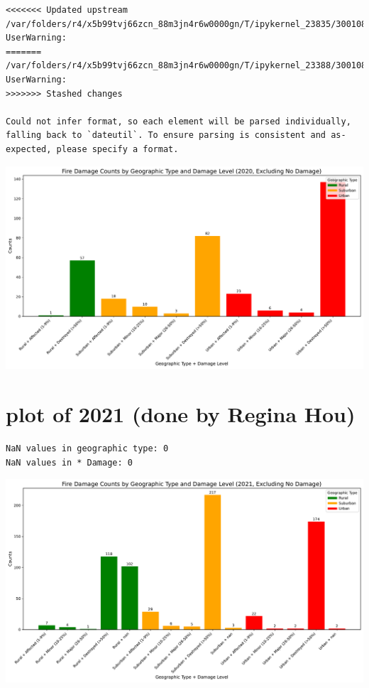 \documentclass[
  letterpaper,
  DIV=11,
  numbers=noendperiod]{scrartcl}
\begin{document}
\begin{verbatim}
<<<<<<< Updated upstream
/var/folders/r4/x5b99tvj66zcn_88m3jn4r6w0000gn/T/ipykernel_23835/3001088990.py:3: UserWarning:
=======
/var/folders/r4/x5b99tvj66zcn_88m3jn4r6w0000gn/T/ipykernel_23388/3001088990.py:3: UserWarning:
>>>>>>> Stashed changes

Could not infer format, so each element will be parsed individually, falling back to `dateutil`. To ensure parsing is consistent and as-expected, please specify a format.
\end{verbatim}

\includegraphics{Final Writeup_files/figure-pdf/cell-12-output-2.pdf}

\section{plot of 2021 (done by Regina
Hou)}\label{plot-of-2021-done-by-regina-hou}

\begin{verbatim}
NaN values in geographic type: 0
NaN values in * Damage: 0
\end{verbatim}

\includegraphics{Final Writeup_files/figure-pdf/cell-14-output-1.pdf}
\end{document}

